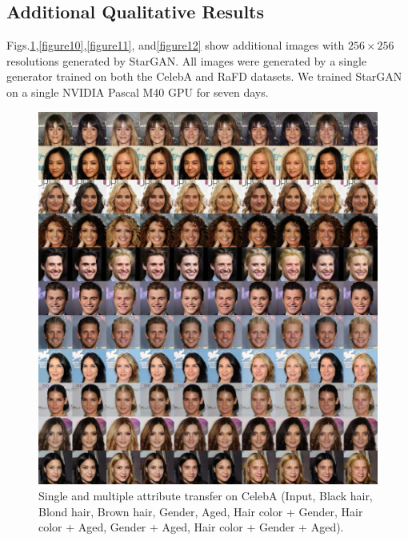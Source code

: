 \documentclass[10pt,twocolumn,letterpaper]{article}
\begin{document}
\subsection{Additional Qualitative Results} 
Figs.\thinspace\ref{figure9},\thinspace\ref{figure10},\thinspace\ref{figure11}, and\thinspace\ref{figure12} show additional images with $256 \times 256$ resolutions generated by StarGAN. All images were generated by a single generator trained on both the CelebA and RaFD datasets. We trained StarGAN on a single NVIDIA Pascal M40 GPU for seven days.
\begin{figure}[h]
\centering
\centerline{\includegraphics[width=1.0\linewidth]{images/supple_CelebA_single_multi.jpg}}
\caption{Single and multiple attribute transfer on CelebA (Input, Black hair, Blond hair, Brown hair, Gender, Aged, Hair color + Gender, Hair color + Aged, Gender + Aged, Hair color + Gender + Aged).}
\label{figure9}
\end{figure}
\end{document}

